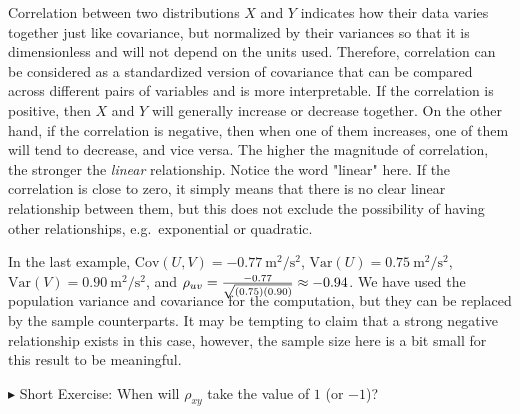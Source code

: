 Correlation between two distributions $X$ and $Y$ indicates how their data varies together just like covariance, but normalized by their variances so that it is dimensionless and will not depend on the units used. Therefore, correlation can be considered as a standardized version of covariance that can be compared across different pairs of variables and is more interpretable. If the correlation is positive, then $X$ and $Y$ will generally increase or decrease together. On the other hand, if the correlation is negative, then when one of them increases, one of them will tend to decrease, and vice versa. The higher the magnitude of correlation, the stronger the \textit{linear} relationship. Notice the word "linear" here. If the correlation is close to zero, it simply means that there is no clear linear relationship between them, but this does not exclude the possibility of having other relationships, e.g.\ exponential or quadratic.\par
In the last example, $\text{Cov}(U,V) = \SI{-0.77}{\square\m \per \square\s}$, $\text{Var}(U) = \SI{0.75}{\square\m \per \square\s}$, $\text{Var}(V) = \SI{0.90}{\square\m \per \square\s}$, and $\rho_{uv} = \smash{\frac{-0.77}{\sqrt{(0.75)(0.90)}}} \approx -0.94$. We have used the population variance and covariance for the computation, but they can be replaced by the sample counterparts. It may be tempting to claim that a strong negative relationship exists in this case, however, the sample size here is a bit small for this result to be meaningful. \par
$\blacktriangleright$ Short Exercise: When will $\rho_{xy}$ take the value of $1$ (or $-1$)?\footnotemark\par

